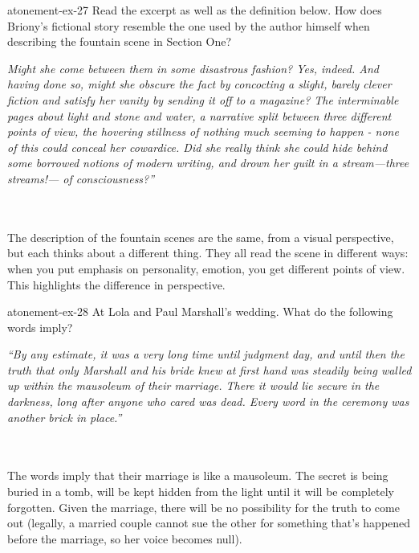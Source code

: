 \documentclass[preview]{standalone}
\begin{document}
\begin{snippetexercise}{atonement-ex-27}
    {Read the excerpt as well as the definition below. How does Briony's fictional story resemble the
    one used by the author himself when describing the fountain scene in Section One?}
    \hspace{0.1\textwidth}
    \begin{minipage}[r]{0.8\textwidth}
        \itshape
        Might she come between them in some disastrous fashion? Yes, indeed. And having done so, might 
        she obscure the fact by concocting a slight, barely clever fiction and satisfy her vanity by sending it
        off to a magazine? The interminable pages about light and stone and water, a narrative split
        between three different points of view, the hovering stillness of nothing much seeming to 
        happen - none of this could conceal her cowardice.
        Did she really think she could hide behind some borrowed notions of modern writing, 
        and drown her guilt in a stream—three streams!— of consciousness?”
    \end{minipage}
    \\\\
    The description of the fountain scenes are the same, from a visual perspective,
    but each thinks about a different thing.
    They all read the scene in different ways: when you put emphasis on personality, emotion,
    you get different points of view.
    This highlights the difference in perspective.
\end{snippetexercise}

\begin{snippetexercise}{atonement-ex-28}
    {At Lola and Paul Marshall's wedding. What do the following words imply?}
    \hspace{0.1\textwidth}
    \begin{minipage}[r]{0.8\textwidth}
        \itshape
        “By any estimate, it was a very long time until judgment day, and until then the truth that only
        Marshall and his bride knew at first hand was steadily being walled up within the mausoleum of
        their marriage. There it would lie secure in the darkness, long after anyone who cared was dead.
        Every word in the ceremony was another brick in place.” 
    \end{minipage}
    \\\\
    The words imply that their marriage is like a mausoleum.
    The secret is being buried in a tomb, will be kept hidden from the light until
    it will be completely forgotten.
    Given the marriage, there will be no possibility for the truth to come out
    (legally, a married couple cannot sue the other for something that's happened
    before the marriage, so her voice becomes null).
\end{snippetexercise}
\end{document}
